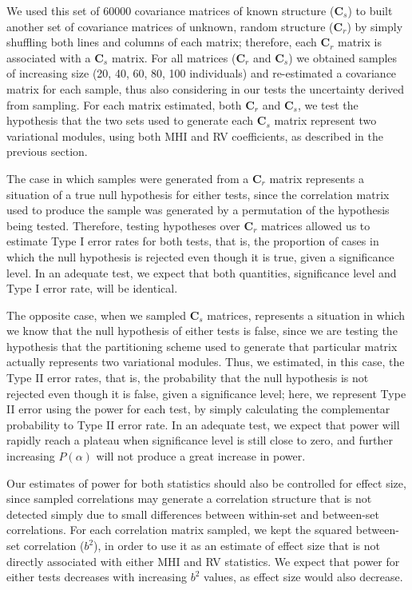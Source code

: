 \documentclass[12pt,twoside]{report}
\begin{document}
We used this set of 60000 covariance matrices of known structure
($\mathbf{C}_s$) to built another set of covariance matrices of unknown,
random structure ($\mathbf{C}_r$) by simply shuffling both lines and
columns of each matrix; therefore, each $\mathbf{C}_r$ matrix is
associated with a $\mathbf{C}_s$ matrix. For all matrices
($\mathbf{C}_r$ and $\mathbf{C}_s$) we obtained samples of increasing
size (20, 40, 60, 80, 100 individuals) and re-estimated a covariance
matrix for each sample, thus also considering in our tests the
uncertainty derived from sampling. For each matrix estimated, both
$\mathbf{C}_r$ and $\mathbf{C}_s$, we test the hypothesis that the two
sets used to generate each $\mathbf{C}_s$ matrix represent two
variational modules, using both MHI and RV coefficients, as described in
the previous section.

The case in which samples were generated from a $\mathbf{C}_r$ matrix
represents a situation of a true null hypothesis for either tests, since
the correlation matrix used to produce the sample was generated by a
permutation of the hypothesis being tested. Therefore, testing
hypotheses over $\mathbf{C}_r$ matrices allowed us to estimate Type I
error rates for both tests, that is, the proportion of cases in which
the null hypothesis is rejected even though it is true, given a
significance level. In an adequate test, we expect that both quantities,
significance level and Type I error rate, will be identical.

The opposite case, when we sampled $\mathbf{C}_s$ matrices, represents a
situation in which we know that the null hypothesis of either tests is
false, since we are testing the hypothesis that the partitioning scheme
used to generate that particular matrix actually represents two
variational modules. Thus, we estimated, in this case, the Type II error
rates, that is, the probability that the null hypothesis is not rejected
even though it is false, given a significance level; here, we represent
Type II error using the power for each test, by simply calculating the
complementar probability to Type II error rate. In an adequate test, we
expect that power will rapidly reach a plateau when significance level
is still close to zero, and further increasing $P(\alpha)$ will not
produce a great increase in power.

Our estimates of power for both statistics should also be controlled for
effect size, since sampled correlations may generate a correlation
structure that is not detected simply due to small differences between
within-set and between-set correlations. For each correlation matrix
sampled, we kept the squared between-set correlation ($b^2$), in order
to use it as an estimate of effect size that is not directly associated
with either MHI and RV statistics. We expect that power for either tests
decreases with increasing $b^2$ values, as effect size would also
decrease.
\end{document}
